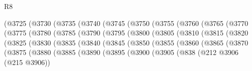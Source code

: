 \begin{lexlean}{R8}
\begin{coremodule}
                (@3725
                  (@3730
                    (@3735
                      (@3740
                        (@3745
                          (@3750
                            (@3755
                              (@3760
                                (@3765
                                  (@3770
                                    (@3775
                                      (@3780
                                        (@3785
                                          (@3790
                                            (@3795
                                              (@3800
                                                (@3805
                                                  (@3810
                                                    (@3815
                                                      (@3820
                                                        (@3825
                                                          (@3830
                                                            (@3835
                                                              (@3840
                                                                (@3845
                                                                  (@3850
                                                                    (@3855
                                                                      (@3860
                                                                        (@3865
                                                                          (@3870
                                                                            (@3875
                                                                              (@3880
                                                                                (@3885
                                                                                  (@3890
                                                                                    (@3895
                                                                                      (@3900
                                                                                        (@3905
                                                                                          (@838
                                                                                            (@212
                                                                                              @3906
                                                                                              (@215
                                                                                                @3906))

\end{coremodule}
\end{lexlean}
